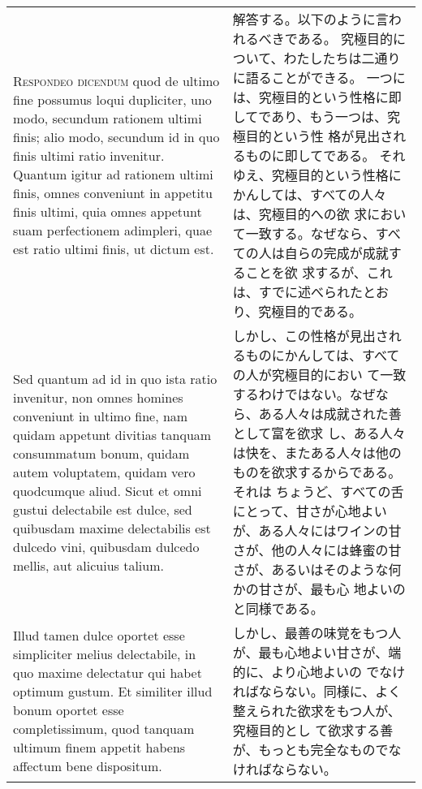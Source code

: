 \documentclass[10pt]{jsarticle} %
\begin{document}
\begin{longtable}{p{21em}p{21em}}
{\scshape Respondeo dicendum} quod de ultimo fine
possumus loqui dupliciter, uno modo, secundum rationem ultimi finis;
alio modo, secundum id in quo finis ultimi ratio invenitur. Quantum
igitur ad rationem ultimi finis, omnes conveniunt in appetitu finis
ultimi, quia omnes appetunt suam perfectionem adimpleri, quae est ratio
ultimi finis, ut dictum est. 



&

解答する。以下のように言われるべきである。
究極目的について、わたしたちは二通りに語ることができる。
一つには、究極目的という性格に即してであり、もう一つは、究極目的という性
 格が見出されるものに即してである。
それゆえ、究極目的という性格にかんしては、すべての人々は、究極目的への欲
 求において一致する。なぜなら、すべての人は自らの完成が成就することを欲
 求するが、これは、すでに述べられたとおり、究極目的である。



\\



Sed quantum ad id in quo ista ratio
invenitur, non omnes homines conveniunt in ultimo fine, nam quidam
appetunt divitias tanquam consummatum bonum, quidam autem voluptatem,
quidam vero quodcumque aliud. Sicut et omni gustui delectabile est
dulce, sed quibusdam maxime delectabilis est dulcedo vini, quibusdam
dulcedo mellis, aut alicuius talium. 



&

しかし、この性格が見出されるものにかんしては、すべての人が究極目的におい
 て一致するわけではない。なぜなら、ある人々は成就された善として富を欲求
 し、ある人々は快を、またある人々は他のものを欲求するからである。それは
 ちょうど、すべての舌にとって、甘さが心地よいが、ある人々にはワインの甘
 さが、他の人々には蜂蜜の甘さが、あるいはそのような何かの甘さが、最も心
 地よいのと同様である。


\\



Illud tamen dulce oportet esse
simpliciter melius delectabile, in quo maxime delectatur qui habet
optimum gustum. Et similiter illud bonum oportet esse completissimum,
quod tanquam ultimum finem appetit habens affectum bene dispositum.


&

しかし、最善の味覚をもつ人が、最も心地よい甘さが、端的に、より心地よいの
 でなければならない。同様に、よく整えられた欲求をもつ人が、究極目的とし
 て欲求する善が、もっとも完全なものでなければならない。



\end{longtable}
\end{document}
